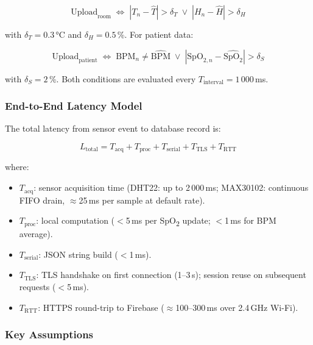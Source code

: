 \begin{equation}
	\text{Upload}_{\text{room}} \;\Leftrightarrow\;
	\left| T_n - \hat{T} \right| > \delta_T \;\lor\;
	\left| H_n - \hat{H} \right| > \delta_H
	\label{eq:room_thresh}
\end{equation}

with $\delta_T = 0.3$\,°C and $\delta_H = 0.5$\,\%.
For patient data:

\begin{equation}
	\text{Upload}_{\text{patient}} \;\Leftrightarrow\;
	\text{BPM}_n \neq \hat{\text{BPM}} \;\lor\;
	\left| \text{SpO}_{2,n} - \widehat{\text{SpO}_2} \right| > \delta_S
	\label{eq:patient_thresh}
\end{equation}

with $\delta_S = 2$\,\%.
Both conditions are evaluated every $T_{\text{interval}} = 1\,000$\,ms.

\subsubsection{End-to-End Latency Model}

The total latency from sensor event to database record is:

\begin{equation}
	L_{\text{total}} = T_{\text{acq}} + T_{\text{proc}} + T_{\text{serial}} +
	T_{\text{TLS}} + T_{\text{RTT}}
	\label{eq:latency}
\end{equation}

where:
\begin{itemize}
	\item $T_{\text{acq}}$: sensor acquisition time (DHT22\cite{dht22_datasheet}: up to 2\,000\,ms;
	      MAX30102\cite{max30102_datasheet}: continuous FIFO drain, $\approx$25\,ms per sample at default rate).
	\item $T_{\text{proc}}$: local computation ($<$5\,ms per SpO\textsubscript{2}
	      update; $<$1\,ms for BPM average).
	\item $T_{\text{serial}}$: JSON string build ($<$1\,ms).
	\item $T_{\text{TLS}}$: TLS handshake on first connection (1--3\,s);
	      session reuse on subsequent requests ($<$5\,ms).
	\item $T_{\text{RTT}}$: HTTPS round-trip to Firebase\cite{firebase_rtdb}
	      ($\approx$100--300\,ms over 2.4\,GHz Wi-Fi).
\end{itemize}

\subsubsection{Key Assumptions}

